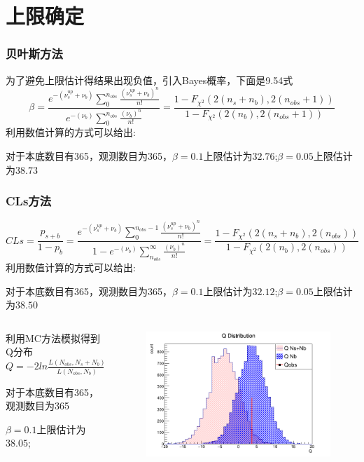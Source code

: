 \documentclass{beamer}
\begin{document}
\section{上限确定}
\begin{frame}
    \frametitle{贝叶斯方法}
    为了避免上限估计得结果出现负值，引入Bayes概率，下面是9.54式
    \[\beta=\frac{e^{-(\nu_s^{up}+\nu_b)}\sum_0^{n_{obs}}{\frac{(\nu_s^{up}+\nu_b)^n}{n!}}}{e^{-(\nu_b)}\sum_0^{n_{obs}}{\frac{(\nu_b)^n}{n!}}}=\frac{1-F_{\chi^2}{(2(n_{s}+n_b),2(n_{obs}+1))}}{1-F_{\chi^2}{(2(n_b),2(n_{obs}+1))}}\]
    利用数值计算的方式可以给出:

    对于本底数目有365，观测数目为365，$\beta=0.1$上限估计为$32.76$;$\beta=0.05$上限估计为$38.73$
\end{frame}
\begin{frame}
    \frametitle{CLs方法}
    \[CLs=\frac{p_{s+b}}{1-p_b}=\frac{e^{-(\nu_s^{up}+\nu_b)}\sum_{0}^{n_{obs}-1}{\frac{(\nu_s^{up}+\nu_b)^n}{n!}}}{1-e^{-(\nu_b)}\sum_{n_{obs}}^{\infty}{\frac{(\nu_b)^n}{n!}}}=\frac{1-F_{\chi^2}{(2(n_{s}+n_b),2(n_{obs}))}}{1-F_{\chi^2}{(2(n_b),2(n_{obs}))}}\]
    利用数值计算的方式可以给出:

    对于本底数目有365，观测数目为365，$\beta=0.1$上限估计为$32.12$;$\beta=0.05$上限估计为$38.50$
    \begin{columns}
        \begin{column}{0.5\textwidth}
            利用MC方法模拟得到Q分布$Q=-2ln\frac{L(N_{obs},N_s+N_b)}{L(N_{obs},N_b)}$

            对于本底数目有365，观测数目为365
            
            $\beta=0.1$上限估计为$38.05$;
        \end{column}
        \begin{column}{0.5\textwidth}
            \begin{figure}[h]
                \includegraphics[width=\columnwidth]{../../B2/final/Qdist_38.png}
            \end{figure}
        \end{column}
    \end{columns}
\end{frame}
\end{document}
